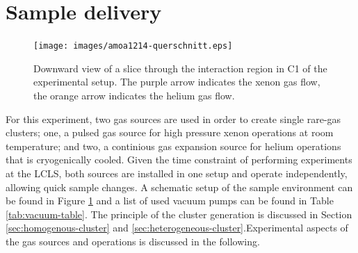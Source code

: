 \section{Sample delivery}\label{sec:sample-delivery}
\begin{figure}
	\centering
		\texttt{[image: images/amoa1214-querschnitt.eps]}
	\caption[Sideview of double sample jet configuration.]{Downward view of a slice through the interaction region in C1 of the experimental setup. The purple arrow indicates the xenon gas flow, the orange arrow indicates the helium gas flow.}
	\label{fig:Overview-Jetalignment}
\end{figure}
For this experiment, two gas sources are used in order to create single rare-gas clusters; one, a pulsed gas source for high pressure xenon operations at room temperature; and two, a continious gas expansion source for helium operations that is cryogenically cooled. Given the time constraint of performing experiments at the LCLS, both sources are installed in one setup and operate independently, allowing quick sample changes. A schematic setup of the sample environment can be found in Figure \ref{fig:Overview-Jetalignment} and a list of used vacuum pumps can be found in Table \ref{tab:vacuum-table}. The principle of the cluster generation is discussed in Section \ref{sec:homogenous-cluster} and \ref{sec:heterogeneous-cluster}.Experimental aspects of the gas sources and operations is discussed in the following.\\[1\baselineskip]
